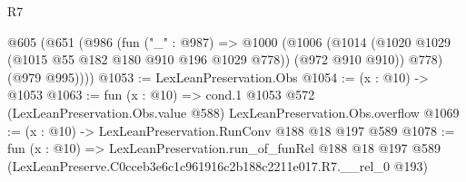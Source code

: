 \begin{lexlean}{R7}
\begin{coremodule}
  @605
    (@651
      (@986
        (fun ("_" : @987) =>
        @1000
          (@1006
            (@1014 (@1020 @1029 (@1015 @55 @182 @180 @910 @196 @1029 @778)) (@972 @910 @910))
            @778)
          (@979 @995))))
@1053 := LexLeanPreservation.Obs
@1054 := (x : @10) -> @1053
@1063 := fun (x : @10) =>
  cond.{1} @1053 @572 (LexLeanPreservation.Obs.value @588) LexLeanPreservation.Obs.overflow
@1069 := (x : @10) -> LexLeanPreservation.RunConv @188 @18 @197 @589
@1078 := fun (x : @10) =>
  LexLeanPreservation.run_of_funRel
    @188
    @18
    @197
    @589
    (LexLeanPreserve.C0cceb3e6c1c961916c2b188c2211e017.R7.__rel_0 @193)
\end{coremodule}
\end{lexlean}
